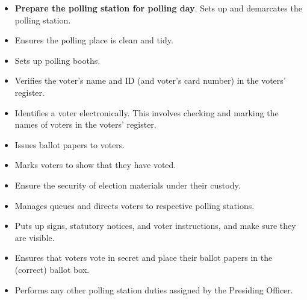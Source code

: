 \documentclass[theme]{cv_einstein}
\begin{document}
\begin{paracol}{2}
\begin{rightcolumn}
            {
                \begin{itemize}
                    \item \textbf{Prepare the polling station for polling day}. Sets up and demarcates the polling station.
                    \item Ensures the polling place is clean and tidy.
                    \item Sets up polling booths.
                    \item Verifies the voter’s name and ID (and voter’s card number) in the voters’ register.
                    \item Identifies a voter electronically. This involves checking and marking the names of voters in the voters’ register.
                    \item Issues ballot papers to voters.
                    \item Marks voters to show that they have voted.
                    \item Ensure the security of election materials under their custody.
                    \item Manages queues and directs voters to respective polling stations.
                    \item Puts up signs, statutory notices, and voter instructions, and make sure they are visible.
                    \item Ensures that voters vote in secret and place their ballot papers in the (correct) ballot box.
                    \item Performs any other polling station duties assigned by the Presiding Officer.
                \end{itemize}
            }
            \vspace{\itemspace}\\

            \vspace{0.2cm}\\
        \end{rightcolumn}


\end{paracol}
\end{document}

